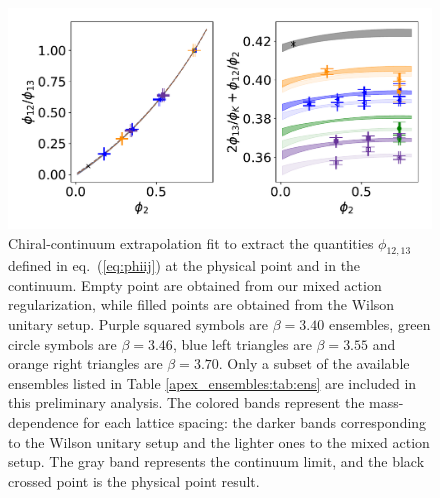 \begin{figure}
  	\centering
  	\includegraphics[scale=.5]{./apendices/figs_appex/mR_ratios_comb.pdf}
  	\caption{Chiral-continuum extrapolation fit to extract the quantities $\phi_{12,13}$ defined in eq.~(\ref{eq:phiij}) at the physical point and in the continuum. Empty point are obtained from our mixed action regularization, while filled points are obtained from the Wilson unitary setup. Purple squared symbols are $\beta=3.40$ ensembles, green circle symbols are $\beta=3.46$, blue left triangles are $\beta=3.55$ and orange right triangles are $\beta=3.70$. Only a subset of the available ensembles listed in Table \ref{apex_ensembles:tab:ens} are included in this preliminary analysis. The colored bands represent the mass-dependence for each lattice spacing: the darker bands corresponding to the Wilson unitary setup and the lighter ones to the mixed action setup. The gray band represents the continuum limit, and the black crossed point is the physical point result.} 
\label{fig:qm} 
\end{figure}



